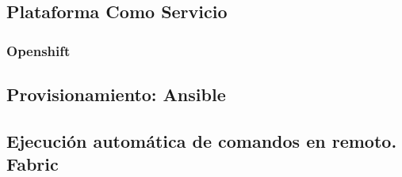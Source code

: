 \subsection{Plataforma Como Servicio}

\subsubsection{Openshift}

\subsection{Provisionamiento: Ansible}

\subsection{Ejecución automática de comandos en remoto. Fabric}

